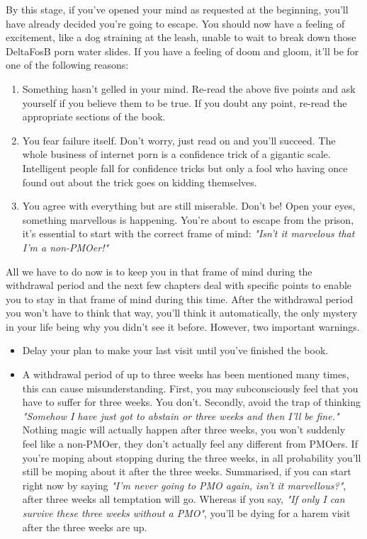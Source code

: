 \documentclass[easypeasy]{subfiles}
\begin{document}
By this stage, if you've opened your mind as requested at the beginning, you'll have already decided you're going to escape. You should now have a feeling of excitement, like a dog straining at the leash, unable to wait to break down those DeltaFosB porn water slides. If you have a feeling of doom and gloom, it'll be for one of the following reasons:
\begin{enumerate}
  \item Something hasn't gelled in your mind. Re-read the above five points and ask yourself if you believe them to be true. If you doubt any point, re-read the appropriate sections of the book.

  \item You fear failure itself. Don't worry, just read on and you'll succeed. The whole business of internet porn is a confidence trick of a gigantic scale. Intelligent people fall for confidence tricks but only a fool who having once found out about the trick goes on kidding themselves.

  \item You agree with everything but are still miserable. Don't be! Open your eyes, something marvellous is happening. You're about to escape from the prison, it's essential to start with the correct frame of mind: \textit{"Isn't it marvelous that I'm a non-PMOer!"}
  \end{enumerate}
All we have to do now is to keep you in that frame of mind during the withdrawal period and the next few chapters deal with specific points to enable you to stay in that frame of mind during this time. After the withdrawal period you won't have to think that way, you'll think it automatically, the only mystery in your life being why you didn't see it before. However, two important warnings.

  \begin{itemize}
  \item Delay your plan to make your last visit until you've finished the book.
  \item A withdrawal period of up to three weeks has been mentioned many times, this can cause misunderstanding. First, you may subconsciously feel that you have to suffer for three weeks. You don't. Secondly, avoid the trap of thinking \textit{"Somehow I have just got to abstain or three weeks and then I'll be fine."} Nothing magic will actually happen after three weeks, you won't suddenly feel like a non-PMOer, they don't actually feel any different from PMOers. If you're moping about stopping during the three weeks, in all probability you'll still be moping about it after the three weeks. Summarised, if you can start right now by saying \textit{"I'm never going to PMO again, isn't it marvellous?"}, after three weeks all temptation will go. Whereas if you say, \textit{"If only I can survive these three weeks without a PMO"}, you'll be dying for a harem visit after the three weeks are up.
  \end{itemize}
\end{document}
